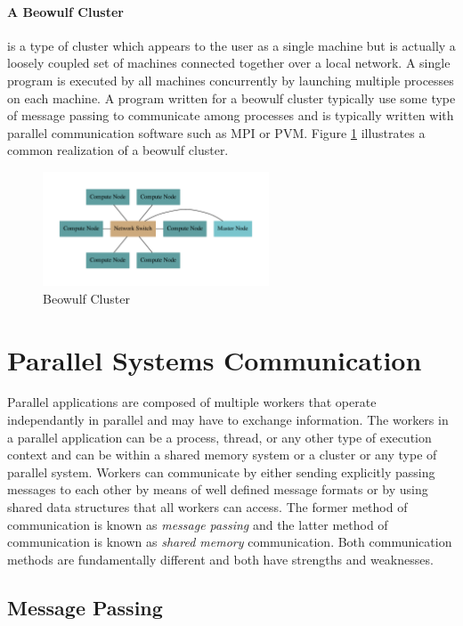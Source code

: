 \documentclass[11pt]{book}
\begin{document}
\paragraph{A Beowulf Cluster} is a type of cluster which appears to the user as a single
machine but is actually a loosely coupled set of machines connected together over a local
network. A single program is executed by all machines concurrently by launching multiple
processes on each machine. A program written for a beowulf cluster typically use some type
of message passing to communicate among processes and is typically written with parallel
communication software such as MPI or PVM. Figure \ref{beowulf} illustrates a common realization
of a beowulf cluster.

\begin{figure}[H]
    \centering
    \includegraphics[width=0.6\textwidth]{figs/graphviz/beowulf.pdf}
    \caption{Beowulf Cluster}\label{beowulf}
\end{figure}

\section{Parallel Systems Communication}

Parallel applications are composed of multiple workers that operate independantly in parallel
and may have to exchange information. The workers in a parallel application can be a process,
thread, or any other type of execution context and can be within a shared memory system or a
cluster or any type of parallel system. Workers can communicate by either sending explicitly
passing messages to each other by means of well defined message formats or by using shared
data structures that all workers can access. The former method of communication is known as
\emph{message passing} and the latter method of communication is known as \emph{shared memory}
communication. Both communication methods are fundamentally different and both have strengths
and weaknesses.

\subsection{Message Passing}
\end{document}
